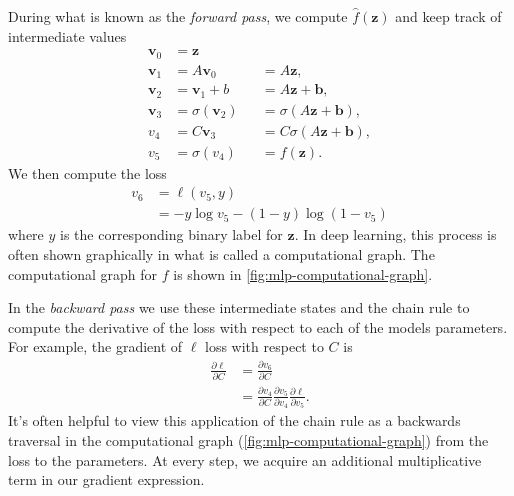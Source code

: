 During what is known as the \emph{forward pass}, we compute $\hat f(\mathbf z)$ and keep track of intermediate values
\begin{equation}
	\begin{aligned}
		\mathbf v_0 & = \mathbf z                                                     \\
		\mathbf v_1 & = A\mathbf v_0        &  & = A \mathbf z,                       \\
		\mathbf v_2 & = \mathbf v_1 + b     &  & = A\mathbf z  + \mathbf b,           \\
		\mathbf v_3 & = \sigma(\mathbf v_2) &  & = \sigma(A\mathbf z  + \mathbf b),   \\
		v_4         & = C \mathbf v_3       &  & = C \sigma(A\mathbf z  + \mathbf b), \\
		v_5         & = \sigma(v_4)         &  & = f(\mathbf z).
	\end{aligned}
\end{equation}
We then compute the loss
\begin{equation}
	\begin{aligned}
		v_6
		 & = \ell (v_5, y)                         \\
		 & = - y \log v_5 - (1 - y) \log (1 - v_5)
	\end{aligned}
\end{equation}
where $y$ is the corresponding binary label for $\mathbf z$.
In deep learning, this process is often shown graphically in what is called a computational graph. The computational graph for $f$ is shown in \autoref{fig:mlp-computational-graph}.

In the \emph{backward pass} we use these intermediate states and the chain rule to compute the derivative of the loss with respect to each of the models parameters.
For example, the gradient of $\ell$ loss with respect to $C$ is
\begin{equation}
	\begin{aligned}
		\frac{\partial \ell}{\partial C}
		 & = \frac{\partial v_6}{\partial C} \\
		 & = \frac{\partial v_4}{\partial C}
		\frac{\partial v_5}{\partial v_4}
		\frac{\partial \ell}{\partial v_5}.
	\end{aligned}
\end{equation}
It's often helpful to view this application of the chain rule as a backwards traversal in the computational graph (\autoref{fig:mlp-computational-graph}) from the loss to the parameters. At every step, we acquire an additional multiplicative term in our gradient expression.

